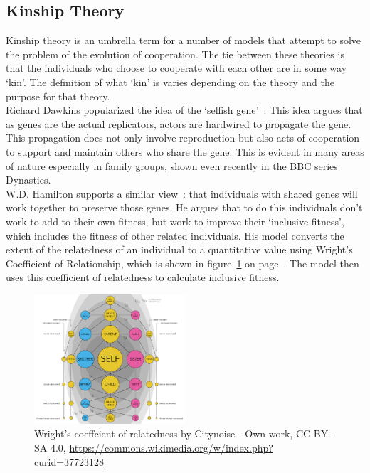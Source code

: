 \documentclass[twoside,twocolumn]{article}
\begin{document}
\subsection{Kinship Theory}
Kinship theory is an umbrella term for a number of models that attempt to solve the problem of the evolution of cooperation. The tie between these theories is that the individuals who choose to cooperate with each other are in some way `kin'. The definition of what `kin' is varies depending on the theory and the purpose for that theory.\\
Richard Dawkins popularized the idea of the `selfish gene'~\cite{selfish_gene}. This idea argues that as genes are the actual replicators, actors are hardwired to propagate the gene. This propagation does not only involve reproduction but also acts of cooperation to support and maintain others who share the gene. This is evident in many areas of nature especially in family groups, shown even recently in the BBC series Dynasties.\\
W.D. Hamilton supports a similar view~\cite{kinhamilton}: that individuals with shared genes will work together to preserve those genes. He argues that to do this individuals don't work to add to their own fitness, but work to improve their `inclusive fitness', which includes the fitness of other related individuals. His model converts the extent of the relatedness of an individual to a quantitative value using Wright's Coefficient of Relationship, which is shown in figure~\ref{fig:coefrelate} on page~\pageref{fig:coefrelate}. The model then uses this coefficient of relatedness to calculate inclusive fitness.
\begin{figure}
		\includegraphics[width=0.5\textwidth]{coefrelate.png}
	\caption{Wright's coeffcient of relatedness by Citynoise - Own work, CC BY-SA 4.0, \url{https://commons.wikimedia.org/w/index.php?curid=37723128}}
	\label{fig:coefrelate}
\end{figure}
\\
\end{document}

